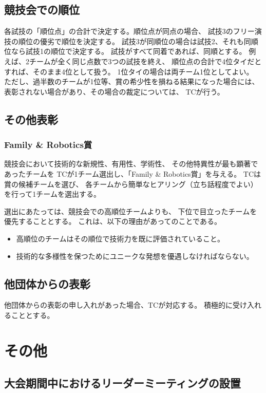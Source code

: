 \documentclass[a4j]{jarticle}
\begin{document}
\subsection{競技会での順位}

各試技の「順位点」の合計で決定する。順位点が同点の場合、
試技3のフリー演技の順位の優劣で順位を決定する。
試技3が同順位の場合は試技2、それも同順位なら試技1の順位で決定する。
試技がすべて同着であれば、同順とする。
例えば、2チームが全く同じ点数で3つの試技を終え、
順位点の合計で4位タイだとすれば、そのまま4位として扱う。
1位タイの場合は両チーム1位としてよい。
ただし、過半数のチームが1位等、賞の希少性を損ねる結果になった場合には、
表彰されない場合があり、その場合の裁定については、
TCが行う。

\subsection{その他表彰}

\subsubsection{Family \& Robotics賞}

競技会において技術的な新規性、有用性、学術性、
その他特異性が最も顕著であったチームを
TCが1チーム選出し、「Family \& Robotics賞」を与える。
TCは賞の候補チームを選び、
各チームから簡単なヒアリング（立ち話程度でよい）
を行って1チームを選出する。

選出にあたっては、競技会での高順位チームよりも、
下位で目立ったチームを優先することとする。
これは、以下の理由があってのことである。
\begin{itemize}
	\item 高順位のチームはその順位で技術力を既に評価されていること。
	\item 技術的な多様性を保つためにユニークな発想を優遇しなければならない。
\end{itemize}

\subsection{他団体からの表彰}

他団体からの表彰の申し入れがあった場合、TCが対応する。
積極的に受け入れることとする。

\section{その他}

\subsection{大会期間中におけるリーダーミーティングの設置}
\end{document}
